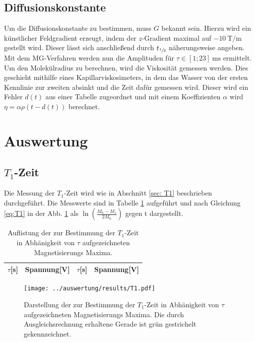 \subsection{Diffusionskonstante}
\label{sec: diff}
Um die Diffusionskonstante zu bestimmen, muss $G$ bekannt sein. Hierzu wird ein künstlicher Feldgradient erzeugt, indem der $z$-Gradient maximal 
auf $-\SI{10}{\tesla\per\m}$ gestellt wird. Dieser lässt sich anschließend durch $t_{\sfrac12}$ näherungsweise angeben. Mit dem MG-Verfahren
werden nun die Amplituden für $\tau\in[1;23]\SI{}{\milli\second}$ ermittelt. Um den Molekülradius zu berechnen, wird die Viskosität gemessen
werden. Dies geschieht mithilfe eines Kapillarviskosimeters, in dem das Wasser von der ersten Kennlinie zur zweiten absinkt und die Zeit
dafür gemessen wird. Dieser wird ein Fehler $d(t)$ aus einer Tabelle zugeordnet und mit einem Koeffizienten $\alpha$ wird $\eta=\alpha\rho(t-d(t))$
berechnet.

\section{Auswertung}
\subsection{$T_1$-Zeit}

Die Messung der $T_1$-Zeit wird wie in Abschnitt \ref{sec: T1} beschrieben durchgeführt. Die Messwerte sind in Tabelle \ref{Tab:T_1} aufgeführt und nach Gleichung \ref{eq:T1} in der Abb. \ref{Abb:T_1} als $\ln \left( \frac{M_0-M_z}{2M_0}\right)$ gegen t dargestellt.


\begin{table}[htbp]
	\begin{center}
		\begin{tabular}{l|c||l|c}
			$\tau$[s] & Spannung[V] & $\tau$[s] & Spannung[V] \\ \hline
			
		\end{tabular}
	\end{center}
	\caption{Auflistung der zur Bestimmung der $T_1$-Zeit in Abhänigkeit von $\tau$ aufgezeichneten Magnetisierungs Maxima.}
	\label{Tab:T_1}
\end{table}


\begin{figure}[H]
	\centering
	\vspace*{-0,85cm}
	\texttt{[image: ../auswertung/results/T1.pdf]}
	\caption{Darstellung der zur Bestimmung der $T_1$-Zeit in Abhänigkeit von $\tau$ aufgezeichneten Magnetisierungs Maxima. Die durch Ausgleichsrechnung erhaltene Gerade ist grün gestrichelt gekennzeichnet.}
	\label{Abb:T_1}
\end{figure}

